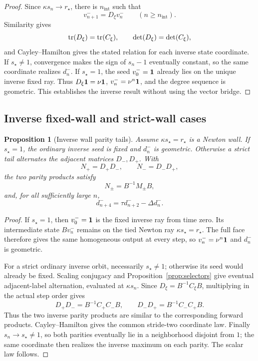 \documentclass[11pt]{article}
\newtheorem{proposition}[theorem]{Proposition}
\theoremstyle{definition}
\theoremstyle{remark}
\begin{document}
\begin{proof}
Since \(\kappa s_n\to r_\star\), there is \(n_{\mathrm{int}}\) such that
\[
v^-_{n+1}=D_\xi v^-_n\qquad(n\geq n_{\mathrm{int}}).
\]
Similarity gives
\[
\operatorname{tr}(D_\xi)=\operatorname{tr}(C_\xi),\qquad
\det(D_\xi)=\det(C_\xi),
\]
and Cayley--Hamilton gives the stated relation for each inverse state
coordinate.  If \(s_\star\neq1\), convergence makes the sign of
\(s_n-1\) eventually constant, so the same coordinate realizes
\(d_n^-\).  If \(s_\star=1\), the seed \(v^-_0=\mathbf{1}\) already lies on
the unique inverse fixed ray.  Thus
\(D_\xi\mathbf{1}=\nu\mathbf{1}\), \(v_n^-=\nu^n\mathbf{1}\), and the degree sequence is
geometric.  This establishes the inverse result without using the vector
bridge.
\end{proof}

\subsection{Inverse fixed-wall and strict-wall cases}

\begin{proposition}[Inverse wall parity tails]
\label{prop:inverse-wall-recurrence}
Assume \(\kappa s_\star=r_\star\) is a Newton wall.  If \(s_\star=1\),
the ordinary inverse seed is fixed and \(d_n^-\) is geometric.  Otherwise
a strict tail alternates the adjacent matrices \(D_-,D_+\).  With
\[
N_+=D_+D_-,\qquad N_-=D_-D_+,
\]
the two parity products satisfy
\[
N_\pm=B^{-1}M_\pm B,
\]
and, for all sufficiently large \(n\),
\[
d^-_{n+4}=\tau d^-_{n+2}-\Delta d^-_n.
\]
\end{proposition}

\begin{proof}
If \(s_\star=1\), then \(v_0^-=\mathbf{1}\) is the fixed inverse ray from time
zero.  Its intermediate state \(Bv_n^-\) remains on the tied Newton ray
\(\kappa s_\star=r_\star\).  The full face therefore gives the same
homogeneous output at every step, so \(v_n^-=\nu^n\mathbf{1}\) and \(d_n^-\)
is geometric.

For a strict ordinary inverse orbit, necessarily \(s_\star\neq1\);
otherwise its seed would already be fixed.  Scaling conjugacy and
Proposition~\ref{prop:selectors} give eventual adjacent-label
alternation, evaluated at \(\kappa s_n\).  Since
\(D_\xi=B^{-1}C_\xi B\), multiplying in the actual step order gives
\[
D_+D_-=B^{-1}C_+C_-B,\qquad
D_-D_+=B^{-1}C_-C_+B.
\]
Thus the two inverse parity products are similar to the corresponding
forward products.  Cayley--Hamilton gives the common stride-two
coordinate law.  Finally \(s_n\to s_\star\neq1\), so both parities
eventually lie in a neighborhood disjoint from \(1\); the same coordinate
then realizes the inverse maximum on each parity.  The scalar law follows.
\end{proof}
\end{document}
